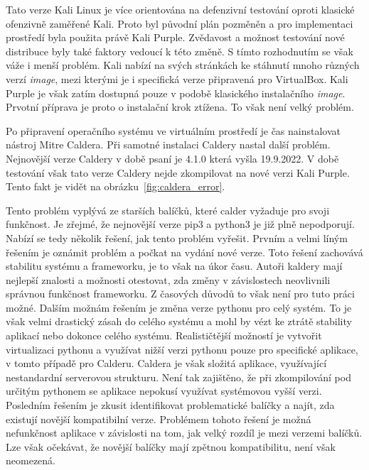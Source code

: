 Tato verze Kali Linux je více orientována na defenzivní testování oproti klasické ofenzivně zaměřené Kali.
Proto byl původní plán pozměněn a pro implementaci prostředí byla použita právě Kali Purple.
Zvědavost a možnost testování nové distribuce byly také faktory vedoucí k této změně.
S tímto rozhodnutím se však váže i menší problém.
Kali nabízí na svých stránkách ke stáhnutí mnoho různých verzí \textit{image}, mezi kterými je i specifická verze připravená pro VirtualBox.
Kali Purple je však zatím dostupná pouze v podobě klasického instalačního \textit{image}.
Prvotní příprava je proto o instalační krok ztížena.
To však není velký problém.

Po připravení operačního systému ve virtuálním prostředí je čas nainstalovat nástroj Mitre Caldera.
Při samotné instalaci Caldery nastal další problém.
Nejnovější verze Caldery v době psaní je 4.1.0 která vyšla 19.9.2022.
V době testování však tato verze Caldery nejde zkompilovat na nové verzi Kali Purple.
Tento fakt je vidět na obrázku~\ref{fig:caldera_error}.


\noindent Tento problém vyplývá ze starších balíčků, které calder vyžaduje pro svoji funkčnost.
Je zřejmé, že nejnovější verze pip3 a python3 je již plně nepodporují.
Nabízí se tedy několik řešení, jak tento problém vyřešit.
Prvním a velmi líným řešením je oznámit problém a počkat na vydání nové verze.
Toto řešení zachovává stabilitu systému a frameworku, je to však na úkor času.
Autoři kaldery mají nejlepší znalosti a možnosti otestovat, zda změny v závislostech neovlivnili správnou funkčnost frameworku.
Z časových důvodů to však není pro tuto práci možné.
Dalším možnám řešením je změna verze pythonu pro celý systém.
To je však velmi drastický zásah do celého systému a mohl by vézt ke ztrátě stability aplikací nebo dokonce celého systému.
Realističtější možností je vytvořit virtualizaci pythonu a využívat nižší verzi pythonu pouze pro specifické aplikace, v tomto případě pro Calderu.
Caldera je však složitá aplikace, využívající nestandardní serverovou strukturu.
Není tak zajištěno, že při zkompilování pod určitým pythonem se aplikace nepokusí využívat systémovou vyšší verzi.
Posledním řešením je zkusit identifikovat problematické balíčky a najít, zda existují novější kompatibilní verze.
Problémem tohoto řešení je možná nefunkčnost aplikace v závislosti na tom, jak velký rozdíl je mezi verzemi balíčků.
Lze však očekávat, že novější balíčky mají zpětnou kompatibilitu, není však neomezená.

